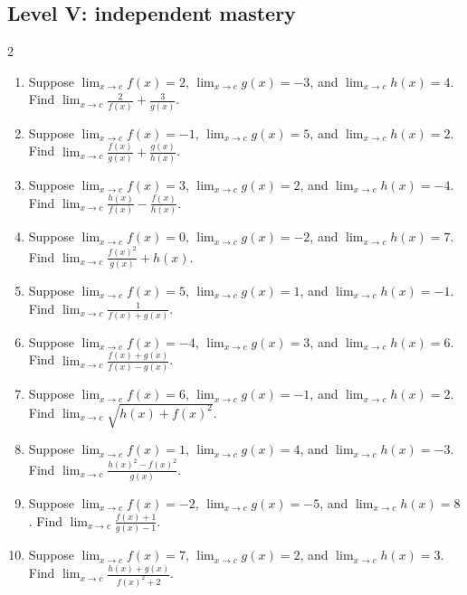 \documentclass[11pt,oneside]{book}
\begin{document}
\subsection*{Level V: independent mastery}
\begin{multicols}{2}
\begin{enumerate}[leftmargin=*,label=\textbf{\arabic*.},itemsep=0.65\baselineskip]
\item Suppose $\lim_{x\to c} f(x)=2$, $\lim_{x\to c} g(x)=-3$, and $\lim_{x\to c} h(x)=4$. Find $\displaystyle\lim_{x\to c} \frac{2}{f(x)}+\frac{3}{g(x)}$.
\item Suppose $\lim_{x\to c} f(x)=-1$, $\lim_{x\to c} g(x)=5$, and $\lim_{x\to c} h(x)=2$. Find $\displaystyle\lim_{x\to c} \frac{f(x)}{g(x)}+\frac{g(x)}{h(x)}$.
\item Suppose $\lim_{x\to c} f(x)=3$, $\lim_{x\to c} g(x)=2$, and $\lim_{x\to c} h(x)=-4$. Find $\displaystyle\lim_{x\to c} \frac{h(x)}{f(x)}-\frac{f(x)}{h(x)}$.
\item Suppose $\lim_{x\to c} f(x)=0$, $\lim_{x\to c} g(x)=-2$, and $\lim_{x\to c} h(x)=7$. Find $\displaystyle\lim_{x\to c} \frac{f(x)^2}{g(x)}+h(x)$.
\item Suppose $\lim_{x\to c} f(x)=5$, $\lim_{x\to c} g(x)=1$, and $\lim_{x\to c} h(x)=-1$. Find $\displaystyle\lim_{x\to c} \frac{1}{f(x)+g(x)}$.
\item Suppose $\lim_{x\to c} f(x)=-4$, $\lim_{x\to c} g(x)=3$, and $\lim_{x\to c} h(x)=6$. Find $\displaystyle\lim_{x\to c} \frac{f(x)+g(x)}{f(x)-g(x)}$.
\item Suppose $\lim_{x\to c} f(x)=6$, $\lim_{x\to c} g(x)=-1$, and $\lim_{x\to c} h(x)=2$. Find $\displaystyle\lim_{x\to c} \sqrt{h(x)+f(x)^2}$.
\item Suppose $\lim_{x\to c} f(x)=1$, $\lim_{x\to c} g(x)=4$, and $\lim_{x\to c} h(x)=-3$. Find $\displaystyle\lim_{x\to c} \frac{h(x)^2-f(x)^2}{g(x)}$.
\item Suppose $\lim_{x\to c} f(x)=-2$, $\lim_{x\to c} g(x)=-5$, and $\lim_{x\to c} h(x)=8$. Find $\displaystyle\lim_{x\to c} \frac{f(x)+1}{g(x)-1}$.
\item Suppose $\lim_{x\to c} f(x)=7$, $\lim_{x\to c} g(x)=2$, and $\lim_{x\to c} h(x)=3$. Find $\displaystyle\lim_{x\to c} \frac{h(x)+g(x)}{f(x)^2+2}$.
\end{enumerate}
\end{multicols}

\backmatter
\end{document}
